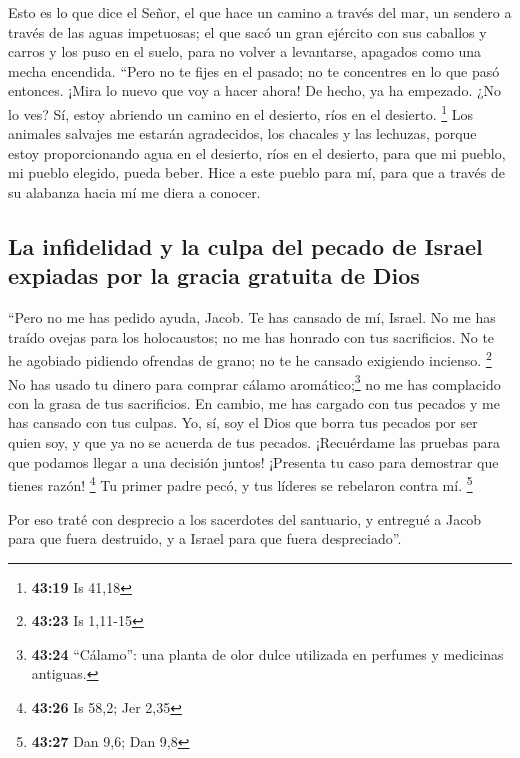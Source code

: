  Esto es lo que dice el Señor, el que hace un camino a
través del mar, un sendero a través de las aguas impetuosas;
 el que sacó un gran ejército con sus caballos y carros y
los puso en el suelo, para no volver a levantarse, apagados como una
mecha encendida.  ``Pero no te fijes en el pasado; no te
concentres en lo que pasó entonces.  ¡Mira lo nuevo que
voy a hacer ahora! De hecho, ya ha empezado. ¿No lo ves? Sí, estoy
abriendo un camino en el desierto, ríos en el desierto. \footnote{\textbf{43:19}
  Is 41,18}  Los animales salvajes me estarán
agradecidos, los chacales y las lechuzas, porque estoy proporcionando
agua en el desierto, ríos en el desierto, para que mi pueblo, mi pueblo
elegido, pueda beber.  Hice a este pueblo para mí, para
que a través de su alabanza hacia mí me diera a conocer.

\hypertarget{la-infidelidad-y-la-culpa-del-pecado-de-israel-expiadas-por-la-gracia-gratuita-de-dios}{%
\subsection{La infidelidad y la culpa del pecado de Israel expiadas por
la gracia gratuita de
Dios}\label{la-infidelidad-y-la-culpa-del-pecado-de-israel-expiadas-por-la-gracia-gratuita-de-dios}}

 ``Pero no me has pedido ayuda, Jacob. Te has cansado de
mí, Israel.  No me has traído ovejas para los
holocaustos; no me has honrado con tus sacrificios. No te he agobiado
pidiendo ofrendas de grano; no te he cansado exigiendo incienso.
\footnote{\textbf{43:23} Is 1,11-15}  No has usado tu
dinero para comprar cálamo aromático;\footnote{\textbf{43:24}
  ``Cálamo'': una planta de olor dulce utilizada en perfumes y medicinas
  antiguas.} no me has complacido con la grasa de tus sacrificios. En
cambio, me has cargado con tus pecados y me has cansado con tus culpas.
 Yo, sí, soy el Dios que borra tus pecados por ser quien
soy, y que ya no se acuerda de tus pecados.  ¡Recuérdame
las pruebas para que podamos llegar a una decisión juntos! ¡Presenta tu
caso para demostrar que tienes razón! \footnote{\textbf{43:26} Is 58,2;
  Jer 2,35}  Tu primer padre pecó, y tus líderes se
rebelaron contra mí. \footnote{\textbf{43:27} Dan 9,6; Dan 9,8}

 Por eso traté con desprecio a los sacerdotes del
santuario, y entregué a Jacob para que fuera destruido, y a Israel para
que fuera despreciado''.

